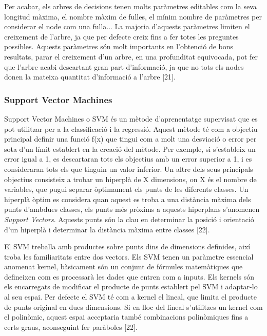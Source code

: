 \documentclass[10pt,a4paper,twocolumn,twoside]{article}
\begin{document}
Per acabar, els arbres de decisions tenen molts paràmetres editables com la seva longitud màxima, el nombre màxim de fulles, el mínim nombre de paràmetres per considerar el node com una fulla... La majoria d'aquests paràmetres limiten el creixement de l'arbre, ja que per defecte creix fins a fer totes les preguntes possibles. Aquests paràmetres són molt importants en l'obtenció de bons resultats, parar el creixement d'un arbre, en una profunditat equivocada, pot fer que l'arbre acabi descartant gran part d'informació, ja que no tots els nodes donen la mateixa quantitat d'informació a l'arbre [21].
\subsubsection{Support Vector Machines}
Support Vector Machines o SVM és un mètode d'aprenentatge supervisat que es pot utilitzar per a la classificació i la regressió. Aquest mètode té com a objectiu principal definir una funció f(x) que tingui com a molt una desviació o error per sota d'un límit establert en la creació del mètode. Per exemple, si s'estableix un error igual a 1, es descartaran tots els objectius amb un error superior a 1, i es consideraran tots els que tinguin un valor inferior. Un altre dels seus principals objectius consisteix a trobar un hiperplà de X dimensions, on X és el nombre de variables, que pugui separar òptimament els punts de les diferents classes. Un hiperplà òptim es considera quan aquest es troba a una distància màxima dels punts d'ambdues classes, els punts més pròxims a aquests hiperplans s'anomenen \textit{Support Vectors}. Aquests punts són la clau en determinar la posició i orientació d'un hiperplà i determinar la distància màxima entre classes [22].

El SVM treballa amb productes sobre punts dins de dimensions definides, així troba les familiaritats entre dos vectors. Els SVM tenen un paràmetre essencial anomenat kernel, bàsicament són un conjunt de fórmules matemàtiques que defineixen com es processarà les dades que entren com a inputs. Els kernels són els encarregats de modificar el producte de punts establert pel SVM i adaptar-lo al seu espai. Per defecte el SVM té com a kernel el lineal, que limita el producte de punts original en dues dimensions. Si en lloc del lineal s'utilitzes un kernel com el polinòmic, aquest espai acceptaria també combinacions polinòmiques fins a certs graus, aconseguint fer paràboles [22].
\end{document}
